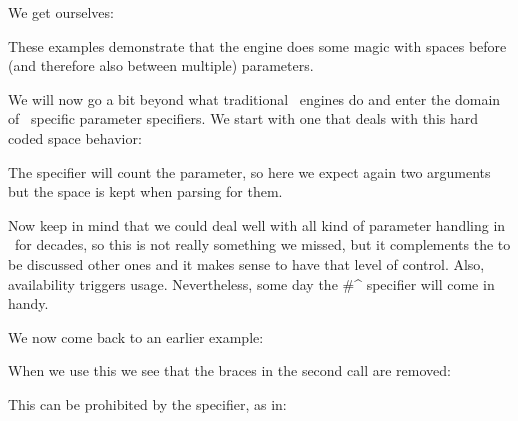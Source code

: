 \typebuffer[example][option=TEX]

We get ourselves:

\startlines \getbuffer[example] \stoplines

These examples demonstrate that the engine does some magic with spaces before
(and therefore also between multiple) parameters.

We will now go a bit beyond what traditional \TEX\ engines do and enter the
domain of \LUAMETATEX\ specific parameter specifiers. We start with one that
deals with this hard coded space behavior:

\startbuffer[definition]
\stopbuffer

\typebuffer[definition][option=TEX] \getbuffer[definition]

The \type {#^} specifier will count the parameter, so here we expect again two
arguments but the space is kept when parsing for them.

\startbuffer[example]
\macro [12]
\macro [ 12]
\macro [12 ]
\macro [ 12 ]
\macro [1 2]
\macro [ 1 2 ]
\stopbuffer

\typebuffer[example][option=TEX]

Now keep in mind that we could deal well with all kind of parameter handling in
\CONTEXT\ for decades, so this is not really something we missed, but it
complements the to be discussed other ones and it makes sense to have that level
of control. Also, availability triggers usage. Nevertheless, some day the \type
{#^} specifier will come in handy.

\startlines \getbuffer[example] \stoplines

We now come back to an earlier example:

\startbuffer[definition]
\stopbuffer

\typebuffer[definition][option=TEX] \getbuffer[definition]

When we use this we see that the braces in the second call are removed:

\startbuffer[example]
\macro [1]
\macro [{1}]
\stopbuffer

\typebuffer[example][option=TEX] \getbuffer[example]

This can be prohibited by the \type {#+} specifier, as in:

\startbuffer[definition]
\stopbuffer

